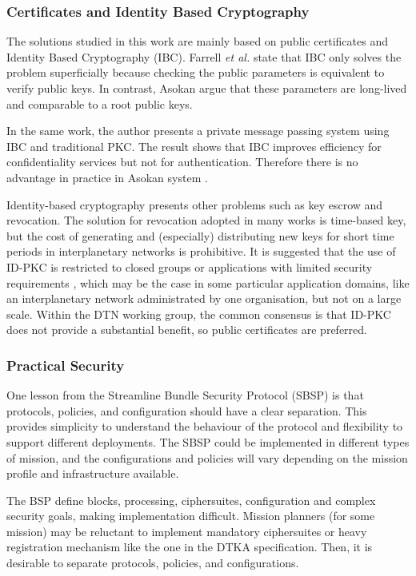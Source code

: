 \subsubsection{Certificates and Identity Based Cryptography}

The solutions studied in this work are mainly based on public certificates and Identity Based Cryptography (IBC). Farrell \textit{et al.} \cite{irtf-dtnrg-sec-overview-06} state that IBC only solves the problem superficially because checking the public parameters is equivalent to verify public keys. In contrast,  Asokan \cite{asokan2007towards} argue that these parameters are long-lived and comparable to a root public keys. 

In the same work, the author presents a private message passing system using IBC and traditional PKC. The result shows that IBC improves efficiency for confidentiality services but not for authentication. Therefore there is no advantage in practice in Asokan system \cite{asokan2007towards}.  

Identity-based cryptography presents other problems such as key escrow and revocation. The solution for revocation adopted in many works is time-based key, but the cost of generating and (especially) distributing new keys for short time periods in interplanetary networks is prohibitive. It is suggested that the use of ID-PKC is restricted to closed groups or applications with limited security requirements \cite{al2003certificateless}, which may be the case in some particular application domains, like an interplanetary network administrated by one organisation, but not on a large scale. Within the DTN working group, the common consensus is that ID-PKC does not provide a substantial benefit, so public certificates are preferred. 

\subsubsection{Practical Security}

One lesson from the Streamline Bundle Security Protocol (SBSP) is that protocols, policies, and configuration should have a clear separation. This provides simplicity to understand the behaviour of the protocol and flexibility to support different deployments.  The SBSP could be implemented in different types of mission, and the configurations and policies will vary depending on the mission profile and infrastructure available.  

The BSP define blocks, processing, ciphersuites, configuration and complex security goals, making implementation difficult. Mission planners (for some mission) may be reluctant to implement mandatory ciphersuites or heavy registration mechanism like the one in the DTKA specification. Then, it is desirable to separate protocols, policies, and configurations.    

